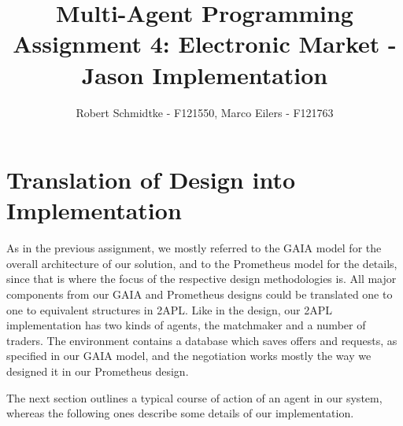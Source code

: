 \documentclass[a4paper,11pt]{article}
\begin{document}
\title{Multi-Agent Programming\\Assignment 4: Electronic Market - Jason Implementation}
\author{Robert Schmidtke - F121550, Marco Eilers - F121763}

\maketitle
\newpage

\section{Translation of Design into Implementation}
As in the previous assignment, we mostly referred to the GAIA model for the overall architecture of our solution, and to the Prometheus model for the details, since that is where the focus of the respective design methodologies is. All major components from our GAIA and Prometheus designs could be translated one to one to equivalent structures in 2APL. Like in the design, our 2APL implementation has two kinds of agents, the matchmaker and a number of traders. The environment contains a database which saves offers and requests, as specified in our GAIA model, and the negotiation works mostly the way we designed it in our Prometheus design.

The next section outlines a typical course of action of an agent in our system, whereas the following ones describe some details of our implementation.
\end{document}
